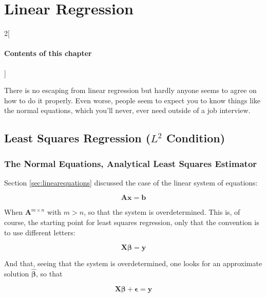 \chapter{Linear Regression}
\label{chap:linearregression}

\begin{multicols}{2}[\subsubsection*{Contents of this chapter}]
\end{multicols}

There is no escaping from linear regression but hardly anyone seems to agree on how to do it properly. Even worse, people seem to expect you to know things like the normal equations, which you'll never, ever need outside of a job interview. 


\section{Least Squares Regression ($L^2$ Condition)}

\subsection{The Normal Equations, Analytical Least Squares Estimator}
Section \ref{sec:linearequations} discussed the case of the linear system of equations:

\begin{equation}
\mathbf{A}\mathbf{x} = \mathbf{b}
\end{equation}


When $\mathbf{A}^{m\times n}$ with $m>n$, so that the system is overdetermined. This is, of course, the starting point for least squares regression, only that the convention is to use different letters:

\begin{equation}
\mathbf{X}\mathbf{\beta} = \mathbf{y}
\end{equation}

And that, seeing that the system is overdetermined, one looks for an approximate solution $\mathbf{\hat{\beta}}$, so that 

\begin{equation}
\mathbf{X}\mathbf{\beta} + \mathbf{\epsilon} = \mathbf{y}
\end{equation}


